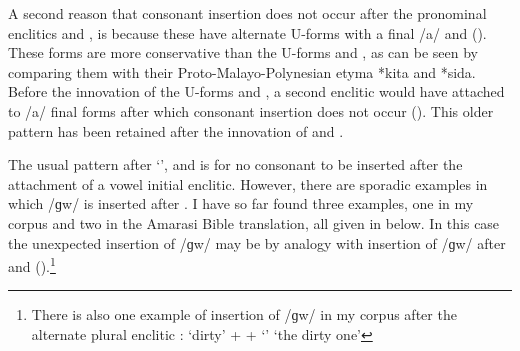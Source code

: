 A second reason that consonant insertion does not
occur after the pronominal enclitics  {\kiit} and  {\siin},
is because these have alternate U-forms
with a final /a/  and  ().
These forms are more conservative than the U-forms  and ,
as can be seen by comparing them with their Proto-Malayo-Polynesian etyma *kita and *sida.
Before the innovation of the U-forms  and ,
a second enclitic would have attached to /a/ final forms
after which consonant insertion does not occur ().
This older pattern has been retained after
the innovation of  and .

The usual pattern after  `{\ein}',
 {\kiit} and  {\siin} is
for no consonant to be inserted after the attachment of a vowel initial enclitic.
However, there are sporadic examples in which /ɡw/ is inserted after .
I have so far found three examples, one in my corpus
and two in the Amarasi Bible translation,
all given in  below.
In this case the unexpected insertion
of /ɡw/ may be by analogy with insertion of /ɡw/
after  and  ().\footnote{
		There is also one example of insertion of /ɡw/ in my corpus
		after the alternate plural enclitic :
		 `dirty' +  {\ein} +  `{\ii}' {\ra}
		 `the dirty one'}

\begin{exe}
\end{exe}

